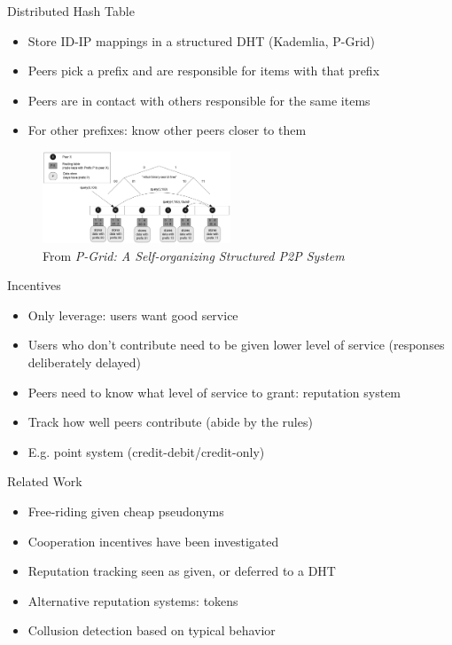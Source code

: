 \documentclass[presentation,english]{beamer}
\begin{document}
\begin{frame}{Distributed Hash Table}
  \begin{itemize}
    \item Store ID-IP mappings in a structured DHT (Kademlia, P-Grid)
    \item Peers pick a prefix and are responsible for items with that prefix
    \item Peers are in contact with others responsible for the same items
    \item For other prefixes: know other peers closer to them
  \end{itemize}
  \begin{figure}
    \centering
    \includegraphics[width=0.5\textwidth]{p-grid}
    \caption*{\tiny From \emph{P-Grid: A Self-organizing Structured P2P System}}
  \end{figure}
\end{frame}

\begin{frame}{Incentives}
  \begin{itemize}
    \item Only leverage: users want good service
    \item Users who don't contribute need to be given lower level of service
          (responses deliberately delayed)
    \item Peers need to know what level of service to grant: reputation system
    \item Track how well peers contribute (abide by the rules)
    \item E.g. point system (credit-debit/credit-only)
  \end{itemize}
\end{frame}

\begin{frame}{Related Work}
  \begin{itemize}
    \item Free-riding given cheap pseudonyms
    \item Cooperation incentives have been investigated
    \item Reputation tracking seen as given, or deferred to a DHT
    \item Alternative reputation systems: tokens
    \item Collusion detection based on typical behavior
  \end{itemize}
\end{frame}
\end{document}
